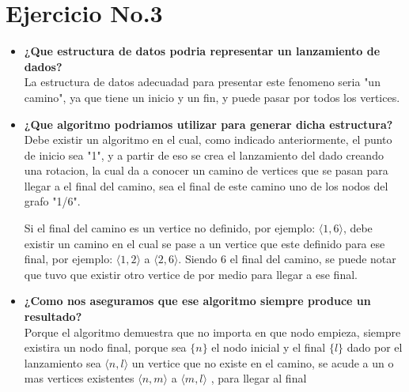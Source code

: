 \documentclass[10pt,a4paper]{article}
\begin{document}
\section*{Ejercicio No.3}
\begin{itemize}
\item \textbf{¿Que estructura de datos podria representar un lanzamiento de dados?}
\
\\ La estructura de datos adecuadad para presentar este fenomeno seria "un camino", ya que tiene un inicio y un fin, y puede pasar por todos los vertices. 
\item \textbf{¿Que algoritmo podriamos utilizar para generar dicha estructura?}
\
\\ Debe existir un algoritmo en el cual, como indicado anteriormente, el punto de inicio sea "1", y a partir de eso se crea el lanzamiento del dado creando una rotacion, la cual da a conocer un camino de vertices que se pasan para llegar a el final del camino, sea el final de este camino uno de los nodos del grafo "1/6".

Si el final del camino es un vertice no definido, por ejemplo: $ \langle 1,6 \rangle $, debe existir un camino en el cual se pase a un vertice que este definido para ese final, por ejemplo:  $ \langle 1,2 \rangle $ a $ \langle 2,6 \rangle  $. Siendo 6 el final del camino, se puede notar que tuvo que existir otro vertice de por medio para llegar a ese final.
\item \textbf{¿Como nos aseguramos que ese algoritmo siempre produce un resultado?}
\
\\ Porque el algoritmo demuestra que no importa en que nodo empieza, siempre existira un nodo final, porque sea $\lbrace n \rbrace$ el nodo inicial y el final $\lbrace l \rbrace$ dado por el lanzamiento sea $ \langle n,l \rangle $  un vertice que no existe en el camino, se acude a un o mas vertices existentes $ \langle n,m \rangle $  a $ \langle m,l \rangle $ , para llegar al final 
\end{itemize}
\end{document}
